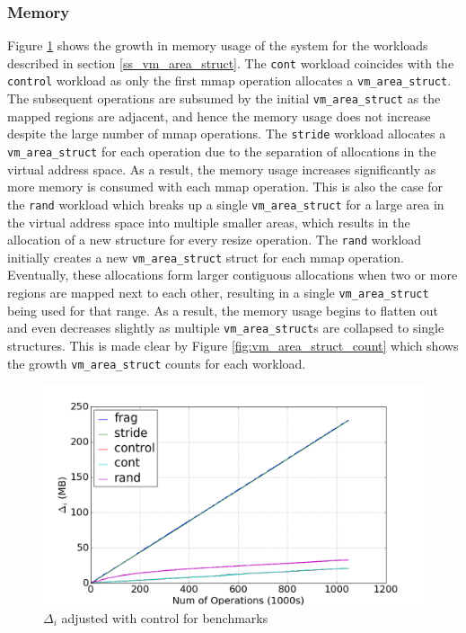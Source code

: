 \documentclass[twocolumn,11pt]{article}
\begin{document}
\subsubsection{Memory}
Figure \ref{fig:mmap_mem_usage} shows the growth in memory usage of the system
for the workloads described in section \ref{ss_vm_area_struct}. The
\texttt{cont} workload coincides with the \texttt{control} workload as only the
first mmap operation allocates a \texttt{vm\_area\_struct}. The subsequent
operations are subsumed by the initial \texttt{vm\_area\_struct} as the mapped
regions are adjacent, and hence the memory usage does not increase despite the
large number of mmap operations.  The \texttt{stride} workload allocates a
\texttt{vm\_area\_struct} for each operation due to the separation of
allocations in the virtual address space. As a result, the memory usage
increases significantly as more memory is consumed with each mmap operation.
This is also the case for the \texttt{rand} workload which breaks up a single
\texttt{vm\_area\_struct} for a large area in the virtual address space into
multiple smaller areas, which results in the  allocation of a new structure for
every resize operation. The \texttt{rand} workload initially creates a new
\texttt{vm\_area\_struct} struct for each mmap operation. Eventually, these
allocations form larger contiguous allocations when two or more regions are
mapped next to each other, resulting in a single \texttt{vm\_area\_struct} being
used for that range. As a result, the memory usage begins to flatten out and
even decreases slightly as multiple \texttt{vm\_area\_struct}s are collapsed to
single structures. This is made clear by Figure \ref{fig:vm_area_struct_count}
which shows the growth \texttt{vm\_area\_struct} counts for each workload.
\begin{figure}
    \includegraphics[width=\columnwidth]{figures/mmap_mem_usage}
    \caption{$\Delta_i$ adjusted with control for benchmarks}
    \label{fig:mmap_mem_usage}
\end{figure}
\end{document}
